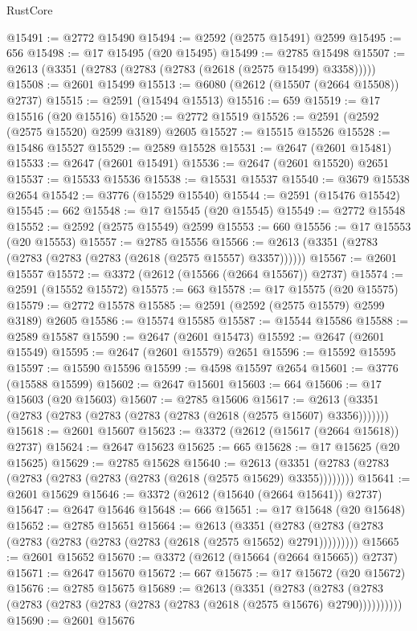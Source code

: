 \begin{lexlean}{RustCore}
\begin{coremodule}
@15491 := @2772 @15490
@15494 := @2592 (@2575 @15491) @2599
@15495 := 656
@15498 := @17 @15495 (@20 @15495)
@15499 := @2785 @15498
@15507 := @2613 (@3351 (@2783 (@2783 (@2783 (@2618 (@2575 @15499) @3358)))))
@15508 := @2601 @15499
@15513 := @6080 (@2612 (@15507 (@2664 @15508)) @2737)
@15515 := @2591 (@15494 @15513)
@15516 := 659
@15519 := @17 @15516 (@20 @15516)
@15520 := @2772 @15519
@15526 := @2591 (@2592 (@2575 @15520) @2599 @3189) @2605
@15527 := @15515 @15526
@15528 := @15486 @15527
@15529 := @2589 @15528
@15531 := @2647 (@2601 @15481)
@15533 := @2647 (@2601 @15491)
@15536 := @2647 (@2601 @15520) @2651
@15537 := @15533 @15536
@15538 := @15531 @15537
@15540 := @3679 @15538 @2654
@15542 := @3776 (@15529 @15540)
@15544 := @2591 (@15476 @15542)
@15545 := 662
@15548 := @17 @15545 (@20 @15545)
@15549 := @2772 @15548
@15552 := @2592 (@2575 @15549) @2599
@15553 := 660
@15556 := @17 @15553 (@20 @15553)
@15557 := @2785 @15556
@15566 := @2613 (@3351 (@2783 (@2783 (@2783 (@2783 (@2618 (@2575 @15557) @3357))))))
@15567 := @2601 @15557
@15572 := @3372 (@2612 (@15566 (@2664 @15567)) @2737)
@15574 := @2591 (@15552 @15572)
@15575 := 663
@15578 := @17 @15575 (@20 @15575)
@15579 := @2772 @15578
@15585 := @2591 (@2592 (@2575 @15579) @2599 @3189) @2605
@15586 := @15574 @15585
@15587 := @15544 @15586
@15588 := @2589 @15587
@15590 := @2647 (@2601 @15473)
@15592 := @2647 (@2601 @15549)
@15595 := @2647 (@2601 @15579) @2651
@15596 := @15592 @15595
@15597 := @15590 @15596
@15599 := @4598 @15597 @2654
@15601 := @3776 (@15588 @15599)
@15602 := @2647 @15601
@15603 := 664
@15606 := @17 @15603 (@20 @15603)
@15607 := @2785 @15606
@15617 := @2613 (@3351 (@2783 (@2783 (@2783 (@2783 (@2783 (@2618 (@2575 @15607) @3356)))))))
@15618 := @2601 @15607
@15623 := @3372 (@2612 (@15617 (@2664 @15618)) @2737)
@15624 := @2647 @15623
@15625 := 665
@15628 := @17 @15625 (@20 @15625)
@15629 := @2785 @15628
@15640 := @2613 (@3351 (@2783 (@2783 (@2783 (@2783 (@2783 (@2783 (@2618 (@2575 @15629) @3355))))))))
@15641 := @2601 @15629
@15646 := @3372 (@2612 (@15640 (@2664 @15641)) @2737)
@15647 := @2647 @15646
@15648 := 666
@15651 := @17 @15648 (@20 @15648)
@15652 := @2785 @15651
@15664 := @2613
    (@3351 (@2783 (@2783 (@2783 (@2783 (@2783 (@2783 (@2783 (@2618 (@2575 @15652) @2791)))))))))
@15665 := @2601 @15652
@15670 := @3372 (@2612 (@15664 (@2664 @15665)) @2737)
@15671 := @2647 @15670
@15672 := 667
@15675 := @17 @15672 (@20 @15672)
@15676 := @2785 @15675
@15689 := @2613
    (@3351
      (@2783 (@2783 (@2783 (@2783 (@2783 (@2783 (@2783 (@2783 (@2618 (@2575 @15676) @2790))))))))))
@15690 := @2601 @15676

\end{coremodule}
\end{lexlean}
